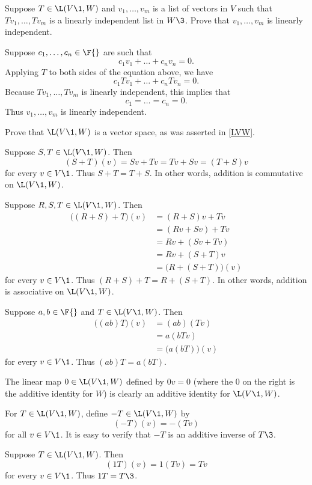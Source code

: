 \exercise
Suppose $T \in \L(V\1, W)$ and $v_1, \dots, v_m$ is a list of vectors in $V$ such that
$Tv_1, \dots, Tv_m$ is a linearly independent list in $W\3$. Prove that $v_1, \dots, v_m$ is linearly independent.

\begin{Solution}
Suppose $c_1, \dots, c_n \in \F{}$ are such that
\[
c_1 v_1 + \dots + c_n v_ n = 0.
\]
Applying $T$ to both sides of the equation above, we have
\[
c_1 Tv_1 + \dots + c_n Tv_n = 0.
\]
Because $Tv_1, \dots, Tv_m$ is linearly independent, this implies that
\[
c_1 = \dots = c_n = 0.
\]
Thus $v_1, \dots, v_m$ is linearly independent.
\end{Solution}

\exercise
Prove that $\L(V\1,W)$ is a vector space, as was asserted in \ref{LVW}.

\begin{Solution}
Suppose $S, T \in \L(V\1, W)$. Then
\[
(S+T)(v) = Sv + Tv = Tv + Sv = (T + S)v
\]
for every $v \in V\1$. Thus $S + T = T + S$. In other words, addition is commutative on $\L(V\1, W)$.

Suppose $R, S, T \in \L(V\1, W)$. Then
\begin{align*}
\bigl( (R + S) + T \bigr)(v) &= (R + S)v + T v \\
&= (Rv + Sv) + Tv \\
&= Rv + (Sv + Tv) \\
&= Rv + (S+T)v \\
&= \bigl( R + (S+T) \bigr)(v)
\end{align*}
for every $v \in V\1$. Thus $(R + S) + T = R + (S + T)$. In other words, addition is associative on $\L(V\1, W)$.

Suppose $a, b \in \F{}$ and $T \in \L(V\1, W)$. Then
\begin{align*}
\bigl( (ab)T \bigr) (v) &= (ab)(Tv) \\
&= a(bTv) \\
&= \bigl( a(bT) \bigr) (v)
\end{align*}
for every $v \in V\1$. Thus $(ab)T = a(bT)$.

The linear map $0 \in \L(V\1, W)$ defined by $0v = 0$ (where the $0$ on the right is the additive identity for $W$) is clearly an additive identity for $\L(V\1, W)$.

For $T \in \L(V\1, W)$, define $-T \in \L(V\1,W)$ by
\[
(-T)(v) = -(Tv)
\]
for all $v \in V\1$. It is easy to verify that $-T$ is an additive inverse of $T\3$.

Suppose $T \in \L(V\1, W)$. Then
\[
(1T)(v) = 1(Tv) = Tv
\]
for every $v \in V\1$. Thus $1T = T\3$.


\end{Solution}
